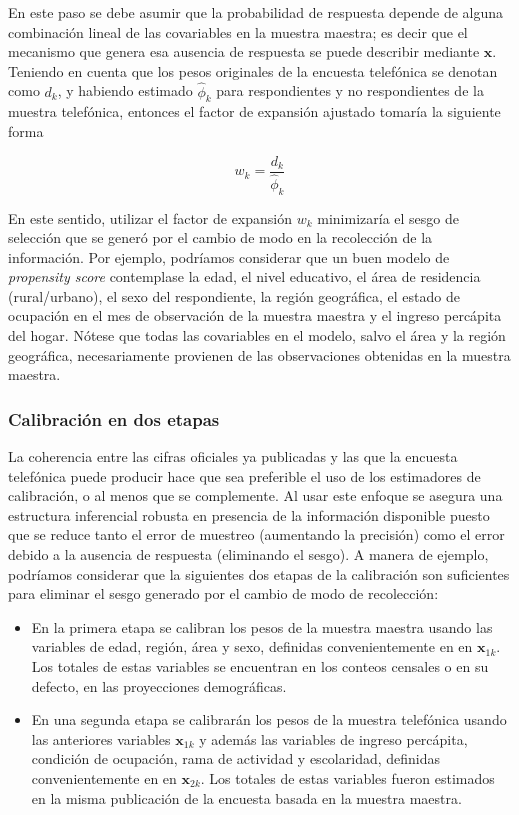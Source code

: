 \documentclass[
  10pt,
  spanish,
]{book}
\providecommand{\tightlist}{%
  \setlength{\itemsep}{0pt}\setlength{\parskip}{0pt}}
\begin{document}
En este paso se debe asumir que la probabilidad de respuesta depende de alguna combinación lineal de las covariables en la muestra maestra; es decir que el mecanismo que genera esa ausencia de respuesta se puede describir mediante \(\mathbf{x}\). Teniendo en cuenta que los pesos originales de la encuesta telefónica se denotan como \(d_k\), y habiendo estimado \(\hat\phi_{k}\) para respondientes y no respondientes de la muestra telefónica, entonces el factor de expansión ajustado tomaría la siguiente forma

\[
w_k = \frac{d_k}{\hat{\phi}_k}
\]

En este sentido, utilizar el factor de expansión \(w_k\) minimizaría el sesgo de selección que se generó por el cambio de modo en la recolección de la información. Por ejemplo, podríamos considerar que un buen modelo de \emph{propensity score} contemplase la edad, el nivel educativo, el área de residencia (rural/urbano), el sexo del respondiente, la región geográfica, el estado de ocupación en el mes de observación de la muestra maestra y el ingreso percápita del hogar. Nótese que todas las covariables en el modelo, salvo el área y la región geográfica, necesariamente provienen de las observaciones obtenidas en la muestra maestra.

\hypertarget{calibraciuxf3n-en-dos-etapas}{%
\subsubsection*{Calibración en dos etapas}\label{calibraciuxf3n-en-dos-etapas}}

La coherencia entre las cifras oficiales ya publicadas y las que la encuesta telefónica puede producir hace que sea preferible el uso de los estimadores de calibración, o al menos que se complemente. Al usar este enfoque se asegura una estructura inferencial robusta en presencia de la información disponible puesto que se reduce tanto el error de muestreo (aumentando la precisión) como el error debido a la ausencia de respuesta (eliminando el sesgo). A manera de ejemplo, podríamos considerar que la siguientes dos etapas de la calibración son suficientes para eliminar el sesgo generado por el cambio de modo de recolección:

\begin{itemize}
\tightlist
\item
  En la primera etapa se calibran los pesos de la muestra maestra usando las variables de edad, región, área y sexo, definidas convenientemente en en \(\boldsymbol{x}_{1k}\). Los totales de estas variables se encuentran en los conteos censales o en su defecto, en las proyecciones demográficas.
\item
  En una segunda etapa se calibrarán los pesos de la muestra telefónica usando las anteriores variables \(\boldsymbol{x}_{1k}\) y además las variables de ingreso percápita, condición de ocupación, rama de actividad y escolaridad, definidas convenientemente en en \(\boldsymbol{x}_{2k}\). Los totales de estas variables fueron estimados en la misma publicación de la encuesta basada en la muestra maestra.
\end{itemize}
\end{document}
